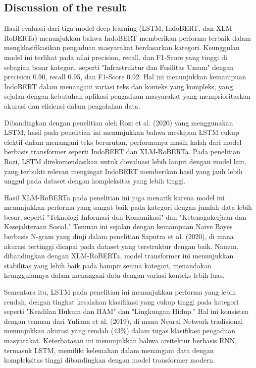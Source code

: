 \documentclass[12pt,a4paper]{article}
\begin{document}
\subsection{Discussion of the result}
\begin{adjustwidth}{3em}{0pt} 
    \hspace{0.5cm} Hasil evaluasi dari tiga model deep learning (LSTM, IndoBERT, dan XLM-RoBERTa) menunjukkan bahwa IndoBERT memberikan performa terbaik dalam mengklasifikasikan pengaduan masyarakat berdasarkan kategori. Keunggulan model ini terlihat pada nilai precision, recall, dan F1-Score yang tinggi di sebagian besar kategori, seperti "Infrastruktur dan Fasilitas Umum" dengan precision 0.90, recall 0.95, dan F1-Score 0.92. Hal ini menunjukkan kemampuan IndoBERT dalam menangani variasi teks dan konteks yang kompleks, yang sejalan dengan kebutuhan aplikasi pengaduan masyarakat yang memprioritaskan akurasi dan efisiensi dalam pengolahan data.

    \hspace{0.5cm} Dibandingkan dengan penelitian oleh Rozi et al. (2020) yang menggunakan LSTM, hasil pada penelitian ini menunjukkan bahwa meskipun LSTM cukup efektif dalam menangani teks berurutan, performanya masih kalah dari model berbasis transformer seperti IndoBERT dan XLM-RoBERTa. Pada penelitian Rozi, LSTM direkomendasikan untuk dievaluasi lebih lanjut dengan model lain, yang terbukti relevan mengingat IndoBERT memberikan hasil yang jauh lebih unggul pada dataset dengan kompleksitas yang lebih tinggi.

    \hspace{0.5cm} Hasil XLM-RoBERTa pada penelitian ini juga menarik karena model ini menunjukkan performa yang sangat baik pada kategori dengan jumlah data lebih besar, seperti "Teknologi Informasi dan Komunikasi" dan "Ketenagakerjaan dan Kesejahteraan Sosial." Temuan ini sejalan dengan kemampuan Naïve Bayes berbasis N-gram yang diuji dalam penelitian Saputra et al. (2020), di mana akurasi tertinggi dicapai pada dataset yang terstruktur dengan baik. Namun, dibandingkan dengan XLM-RoBERTa, model transformer ini menunjukkan stabilitas yang lebih baik pada hampir semua kategori, menandakan keunggulannya dalam menangani data dengan variasi konteks lebih luas.

    \hspace{0.5cm} Sementara itu, LSTM pada penelitian ini menunjukkan performa yang lebih rendah, dengan tingkat kesalahan klasifikasi yang cukup tinggi pada kategori seperti "Keadilan Hukum dan HAM" dan "Lingkungan Hidup." Hal ini konsisten dengan temuan dari Yuliana et al. (2019), di mana Neural Network tradisional menunjukkan akurasi yang rendah (43\%) dalam tugas klasifikasi pengaduan masyarakat. Keterbatasan ini menunjukkan bahwa arsitektur berbasis RNN, termasuk LSTM, memiliki kelemahan dalam menangani data dengan kompleksitas tinggi dibandingkan dengan model transformer modern.


\end{adjustwidth}
\end{document}
